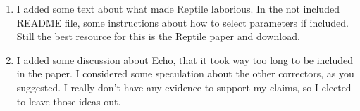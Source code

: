 \documentclass[11pt]{article}
\begin{document}
\begin{enumerate}
\begin{addmargin}[2em]{2em}
I am happy to make them part of the main document, but I figured that 7 figures for a short MS is too much, and these are important only in that they characterize the simulated datasets, but do speak to findings.
\end{addmargin}

\item I added some text about what made Reptile laborious. In the not included README file, some instructions about how to select parameters if included. Still the best resource for this is the Reptile paper and download.

\item I added some discussion about Echo, that it took way too long to be included in the paper. I considered some speculation about the other correctors, as you suggested. I really don't have any evidence to support my claims, so I elected to leave those ideas out. 

\end{enumerate}
\end{document}
